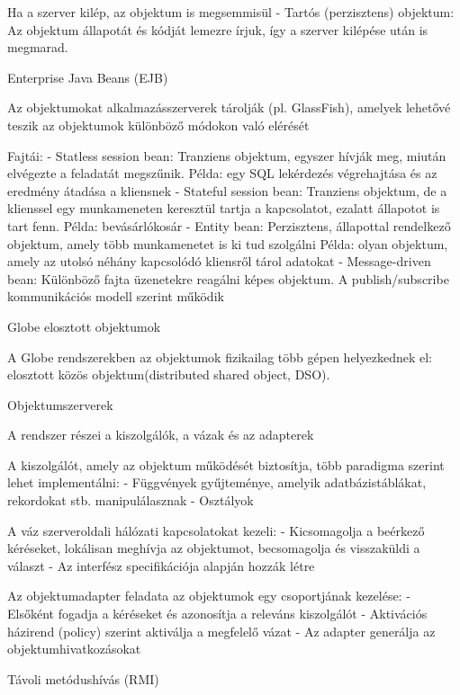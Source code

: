 \documentclass[12pt]{article}
\begin{document}
\begin{description}
        Ha a szerver kilép, az objektum is megsemmisül
        - Tartós (perzisztens) objektum: Az objektum állapotát és kódját lemezre írjuk, így a szerver kilépése után
        is megmarad.
    \item  Enterprise Java Beans (EJB)
    \item Az objektumokat alkalmazásszerverek tárolják (pl. GlassFish), amelyek lehetővé teszik az objektumok
        különböző módokon való elérését
    \item Fajtái:
        - Statless session bean: Tranziens objektum, egyszer hívják meg, miután elvégezte a feladatát megszűnik.
        Példa: egy SQL lekérdezés végrehajtása és az eredmény átadása a kliensnek
        - Stateful session bean: Tranziens objektum, de a klienssel egy munkameneten keresztül tartja a kapcsolatot,
        ezalatt állapotot is tart fenn. Példa: bevásárlókosár
        - Entity bean: Perzisztens, állapottal rendelkező objektum, amely több munkamenetet is ki tud szolgálni
        Példa: olyan objektum, amely az utolsó néhány kapcsolódó kliensről tárol adatokat
        - Message-driven bean: Különböző fajta üzenetekre reagálni képes objektum. A publish/subscribe kommunikációs
        modell szerint működik
    \item  Globe elosztott objektumok
    \item A Globe rendszerekben az objektumok fizikailag több gépen helyezkednek el: elosztott közös objektum(distributed shared object, DSO).
    \item  Objektumszerverek
    \item A rendszer részei a kiszolgálók, a vázak és az adapterek
    \item A kiszolgálót, amely az objektum működését biztosítja, több paradigma szerint lehet implementálni:
        - Függvények gyűjteménye, amelyik adatbázistáblákat, rekordokat stb.
        manipulálasznak
        - Osztályok
    \item A váz szerveroldali hálózati kapcsolatokat kezeli:
        - Kicsomagolja a beérkező kéréseket, lokálisan meghívja az objektumot, becsomagolja és visszaküldi a választ
        - Az interfész specifikációja alapján hozzák létre
    \item Az objektumadapter feladata az objektumok egy csoportjának kezelése:
        - Elsőként fogadja a kéréseket és azonosítja a releváns kiszolgálót
        - Aktivációs házirend (policy) szerint aktiválja  a megfelelő vázat
        - Az adapter generálja az objektumhivatkozásokat 
    \item  Távoli metódushívás (RMI)

\end{description}
\end{document}
